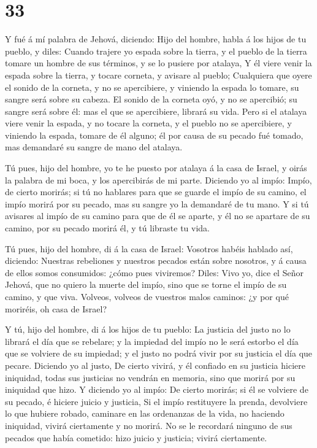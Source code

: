 \hypertarget{section-32}{%
\section{33}\label{section-32}}

 Y fué á mí palabra de Jehová, diciendo:  Hijo
del hombre, habla á los hijos de tu pueblo, y diles: Cuando trajere yo
espada sobre la tierra, y el pueblo de la tierra tomare un hombre de sus
términos, y se lo pusiere por atalaya,  Y él viere venir la
espada sobre la tierra, y tocare corneta, y avisare al pueblo;
 Cualquiera que oyere el sonido de la corneta, y no se
apercibiere, y viniendo la espada lo tomare, su sangre será sobre su
cabeza.  El sonido de la corneta oyó, y no se apercibió; su
sangre será sobre él: mas el que se apercibiere, librará su vida.
 Pero si el atalaya viere venir la espada, y no tocare la
corneta, y el pueblo no se apercibiere, y viniendo la espada, tomare de
él alguno; él por causa de su pecado fué tomado, mas demandaré su sangre
de mano del atalaya.

 Tú pues, hijo del hombre, yo te he puesto por atalaya á la
casa de Israel, y oirás la palabra de mi boca, y los apercibirás de mi
parte.  Diciendo yo al impío: Impío, de cierto morirás; si
tú no hablares para que se guarde el impío de su camino, el impío morirá
por su pecado, mas su sangre yo la demandaré de tu mano.  Y
si tú avisares al impío de su camino para que de él se aparte, y él no
se apartare de su camino, por su pecado morirá él, y tú libraste tu
vida.

 Tú pues, hijo del hombre, di á la casa de Israel: Vosotros
habéis hablado así, diciendo: Nuestras rebeliones y nuestros pecados
están sobre nosotros, y á causa de ellos somos consumidos: ¿cómo pues
viviremos?  Diles: Vivo yo, dice el Señor Jehová, que no
quiero la muerte del impío, sino que se torne el impío de su camino, y
que viva. Volveos, volveos de vuestros malos caminos: ¿y por qué
moriréis, oh casa de Israel?

 Y tú, hijo del hombre, di á los hijos de tu pueblo: La
justicia del justo no lo librará el día que se rebelare; y la impiedad
del impío no le será estorbo el día que se volviere de su impiedad; y el
justo no podrá vivir por su justicia el día que pecare. 
Diciendo yo al justo, De cierto vivirá, y él confiado en su justicia
hiciere iniquidad, todas sus justicias no vendrán en memoria, sino que
morirá por su iniquidad que hizo.  Y diciendo yo al impío:
De cierto morirás; si él se volviere de su pecado, é hiciere juicio y
justicia,  Si el impío restituyere la prenda, devolviere lo
que hubiere robado, caminare en las ordenanzas de la vida, no haciendo
iniquidad, vivirá ciertamente y no morirá.  No se le
recordará ninguno de sus pecados que había cometido: hizo juicio y
justicia; vivirá ciertamente.

